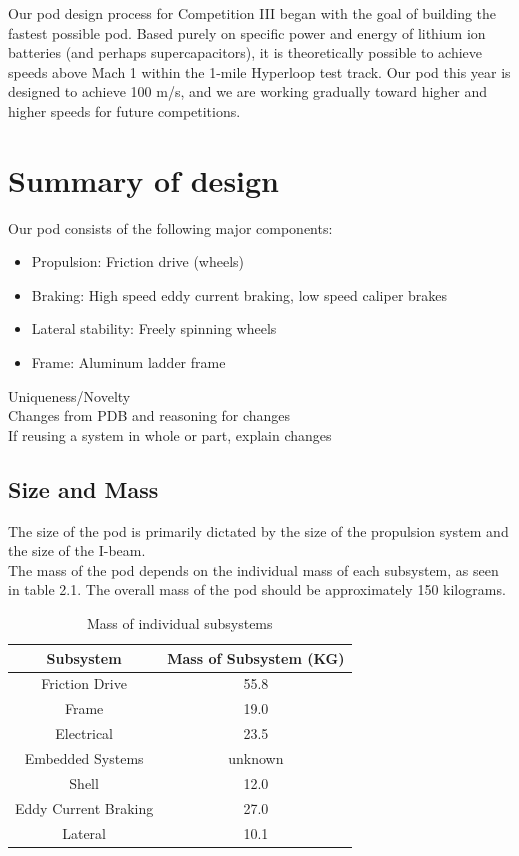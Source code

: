 \documentclass[main.tex]{subfiles}
\begin{document}
Our pod design process for Competition III began with the goal of building the fastest possible pod. Based purely on specific power and energy of lithium ion batteries (and perhaps supercapacitors), it is theoretically possible to achieve speeds above Mach 1 within the 1-mile Hyperloop test track. Our pod this year is designed to achieve 100 m/s, and we are working gradually toward higher and higher speeds for future competitions.


\section{Summary of design}
Our pod consists of the following major components:
\begin{itemize}
    \item Propulsion: Friction drive (wheels)
    \item Braking: High speed eddy current braking, low speed caliper brakes
    \item Lateral stability: Freely spinning wheels
    \item Frame: Aluminum ladder frame
\end{itemize}
Uniqueness/Novelty\\
Changes from PDB and reasoning for changes\\
If reusing a system in whole or part, explain changes\\

\subsection{Size and Mass}
The size of the pod is primarily dictated by the size of the propulsion system and the size of the I-beam.\\
The mass of the pod depends on the individual mass of each subsystem, as seen in table 2.1. The overall mass of the pod should be approximately 150 kilograms. 

\begin{table}[H]
\centering
\begin{tabular}{c c}
	\toprule Subsystem & Mass of Subsystem (KG) \\ \midrule
    Friction Drive & 55.8 \\
    Frame & 19.0 \\
    Electrical & 23.5 \\
    Embedded Systems & unknown \\ 
    Shell & 12.0 \\ 
    Eddy Current Braking & 27.0 \\
    Lateral & 10.1 \\ 
    \end{tabular}
  \caption{Mass of individual subsystems}
  \label{table:bearingtable}
\end{table}
    
\end{document}
